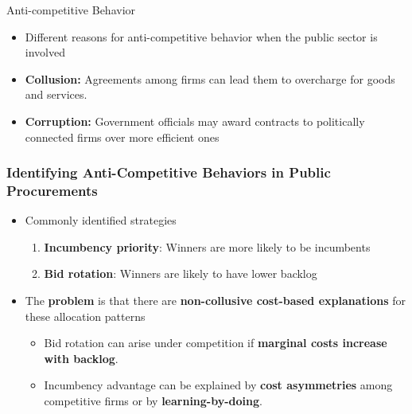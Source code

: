 \documentclass[12pt,english,xcolor=dvipsnames,aspectratio=1610]{beamer}
\begin{document}
\begin{frame}{Anti-competitive Behavior}
    \begin{itemize}
        \item Different reasons for anti-competitive behavior when the public sector is involved\vspace{2mm}
        \item \textbf{Collusion:} Agreements among firms can lead them to overcharge for goods and services.\vspace{2mm}
        \item \textbf{Corruption:} Government officials may award contracts to politically connected firms over more efficient ones\vspace{2mm}
    \end{itemize}
\end{frame}

\begin{frame}
\frametitle{Identifying Anti-Competitive Behaviors in Public Procurements}

\begin{itemize}
    \item Commonly identified strategies \vspace{2mm}
    \begin{enumerate}
    \item \textbf{Incumbency priority}: Winners are more likely to be incumbents\vspace{2mm}
    \item \textbf{Bid rotation}: Winners are likely to have lower backlog
    \end{enumerate}
     \vspace{2mm}\pause
    \item The \textbf{problem} is that there are \textbf{non-collusive cost-based explanations} for these allocation patterns\vspace{2mm}
    \begin{itemize}
        \item Bid rotation can arise under competition if \textbf{marginal costs increase with backlog}.\vspace{2mm}
        \item Incumbency advantage can be explained by \textbf{cost asymmetries} among competitive firms or by \textbf{learning-by-doing}.
    \end{itemize}
    \end{itemize}
\end{frame}
\end{document}
